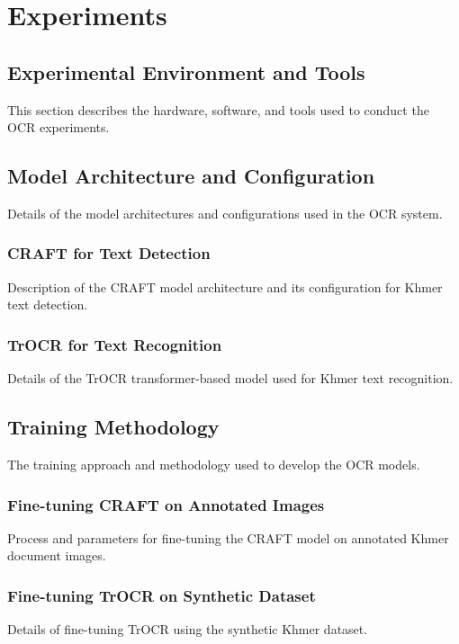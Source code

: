 \chapter{Experiments}
\label{ch:experiments}

\section{Experimental Environment and Tools}
\label{sec:environment}
This section describes the hardware, software, and tools used to conduct the OCR experiments.

\section{Model Architecture and Configuration}
\label{sec:architecture}
Details of the model architectures and configurations used in the OCR system.

\subsection{CRAFT for Text Detection}
\label{subsec:craft}
Description of the CRAFT model architecture and its configuration for Khmer text detection.

\subsection{TrOCR for Text Recognition}
\label{subsec:trocr}
Details of the TrOCR transformer-based model used for Khmer text recognition.

\section{Training Methodology}
\label{sec:training}
The training approach and methodology used to develop the OCR models.

\subsection{Fine-tuning CRAFT on Annotated Images}
\label{subsec:craft-training}
Process and parameters for fine-tuning the CRAFT model on annotated Khmer document images.

\subsection{Fine-tuning TrOCR on Synthetic Dataset}
\label{subsec:trocr-training}
Details of fine-tuning TrOCR using the synthetic Khmer dataset.

